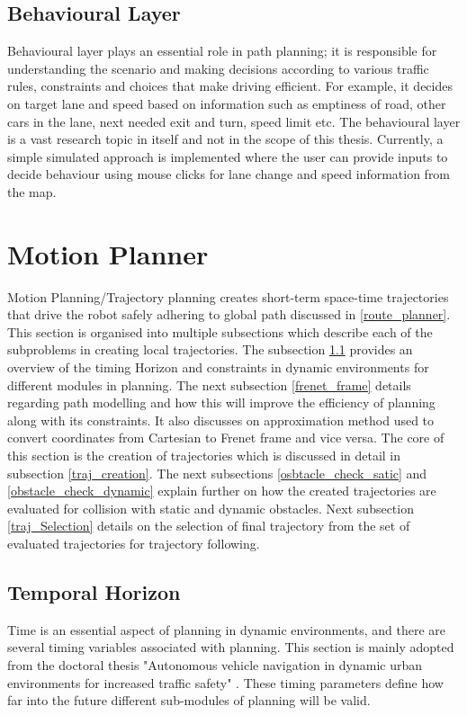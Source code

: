 \subsection{Behavioural Layer}
Behavioural layer plays an essential role in path planning; it is responsible for understanding the scenario and making decisions according to various traffic rules, constraints and choices that make driving efficient. For example, it decides on target lane and speed based on information such as emptiness of road, other cars in the lane, next needed exit and turn, speed limit etc. The behavioural layer is a vast research topic in itself and not in the scope of this thesis. Currently, a simple simulated approach is implemented where the user can provide inputs to decide behaviour using mouse clicks for lane change and speed information from the map.

\section{Motion Planner} \label{motion_planner}
Motion Planning/Trajectory planning creates short-term space-time trajectories that drive the robot safely adhering to global path discussed in \ref{route_planner}. This section is organised into multiple subsections which describe each of the subproblems in creating local trajectories. The subsection \ref{timing_constraints} provides an overview of the timing Horizon and constraints in dynamic environments for different modules in planning. The next subsection \ref{frenet_frame} details regarding path modelling and how this will improve the efficiency of planning along with its constraints. It also discusses on approximation method used to convert coordinates from Cartesian to Frenet frame and vice versa. The core of this section is the creation of trajectories which is discussed in detail in subsection \ref{traj_creation}. The next subsections \ref{osbtacle_check_satic} and \ref{obstacle_check_dynamic} explain further on how the created trajectories are evaluated for collision with static and dynamic obstacles. Next subsection \ref{traj_Selection} details on the selection of final trajectory from the set of evaluated trajectories for trajectory following.

\subsection{Temporal Horizon} \label{timing_constraints}
Time is an essential aspect of planning in dynamic environments, and there are several timing variables associated with planning. This section is mainly adopted from the doctoral thesis "Autonomous vehicle navigation in dynamic urban environments for increased traffic safety" \cite{eth_timing_constraints}. These timing parameters define how far into the future different sub-modules of planning will be valid. 

